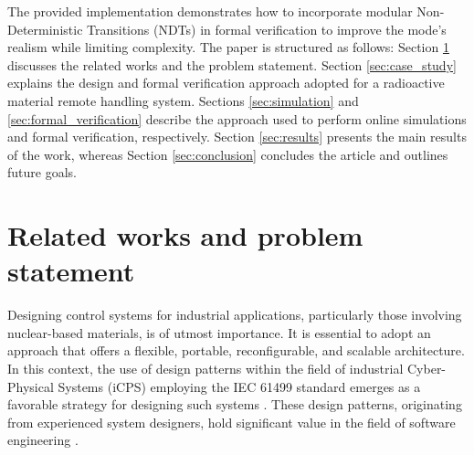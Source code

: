 \documentclass{ieeeojies}
\begin{document}
The provided implementation demonstrates how to incorporate modular Non-Deterministic Transitions (NDTs) in formal verification to improve the mode's realism while limiting complexity. 
The paper is structured as follows: Section \ref{sec:problem_statement} discusses the related works and the problem statement. Section \ref{sec:case_study} explains the design and formal verification approach adopted for a radioactive material remote handling system. Sections \ref{sec:simulation} and \ref{sec:formal_verification} describe the approach used to perform online simulations and formal verification, respectively. Section \ref{sec:results} presents the main results of the work, whereas Section \ref{sec:conclusion} concludes the article and outlines future goals.

\section{Related works and problem statement}
\label{sec:problem_statement}
Designing control systems for industrial applications, particularly those involving nuclear-based materials, is of utmost importance. It is essential to adopt an approach that offers a flexible, portable, reconfigurable, and scalable architecture. 
In this context, the use of design patterns within the field of industrial Cyber-Physical Systems (iCPS) employing the IEC 61499 standard emerges as a favorable strategy for designing such systems \cite{dai2017discrete, patil2018}. 
These design patterns, originating from experienced system designers, hold significant value in the field of software engineering \cite{gamma1995design}.
\end{document}
